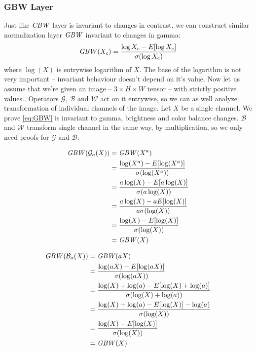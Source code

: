 \subsubsection{GBW Layer}
Just like $\mathit{CBW}$ layer is invariant to changes in contrast,
we can construct similar normalization layer $\mathit{GBW}$ invariant to changes in
gamma:
\begin{equation}
    \mathit{GBW}(X_c) = \frac{\log{X_c}-E[\log{X_c}]}{\sigma(\log{X_c})}
    \label{eq:GBW}
\end{equation}
where $\log(X)$ is entrywise logarithm of $X$. The base of the
logarithm is not very important -- invariant behaviour doesn't depend on it's value.
Now let us assume that we're given an image -- $3\times H \times W$ tensor --
with strictly positive values..
Operators $\mathcal{G}$, $\mathcal{B}$ and $\mathcal{W}$ act on it entrywise, so
we can as well analyze transformation of individual channels of the image.
Let $X$ be a single channel.
We prove \ref{eq:GBW} is invariant to gamma, brightness and color balance
changes. $\mathcal{B}$ and $\mathcal{W}$ transform single channel in the same
way, by multiplication,
so we only need proofs for $\mathcal{G}$ and $\mathcal{B}$:

\begin{align*}
    \mathit{GBW}(\mathcal{G}_a(X)) &=
    \mathit{GBW}(X^a) \\
    &= \frac{\log(X^a)-E[\log(X^a)]}{\sigma(\log(X^a))} \\
    &= \frac{a\log(X)-E[a\log(X)]}{\sigma(a\log(X))} \\
    &= \frac{a\log(X)-aE[\log(X)]}{a\sigma(\log(X))} \\
    &= \frac{\log(X)-E[\log(X)]}{\sigma(\log(X))} \\
    &= \mathit{GBW}(X)
\end{align*}

\begin{align*}
    \mathit{GBW}(\mathcal{B}_a(X)) &=
    \mathit{GBW}(aX) \\
    &= \frac{\log(aX)-E[\log(aX)]}{\sigma(\log(aX))} \\
    &= \frac{\log(X)+\log(a)-E[\log(X)+\log(a)]}{\sigma(\log(X)+\log(a))} \\
    &= \frac{\log(X)+\log(a)-E[\log(X)]-\log(a)}{\sigma(\log(X))} \\
    &= \frac{\log(X)-E[\log(X)]}{\sigma(\log(X))} \\
    &= \mathit{GBW}(X)
\end{align*}

